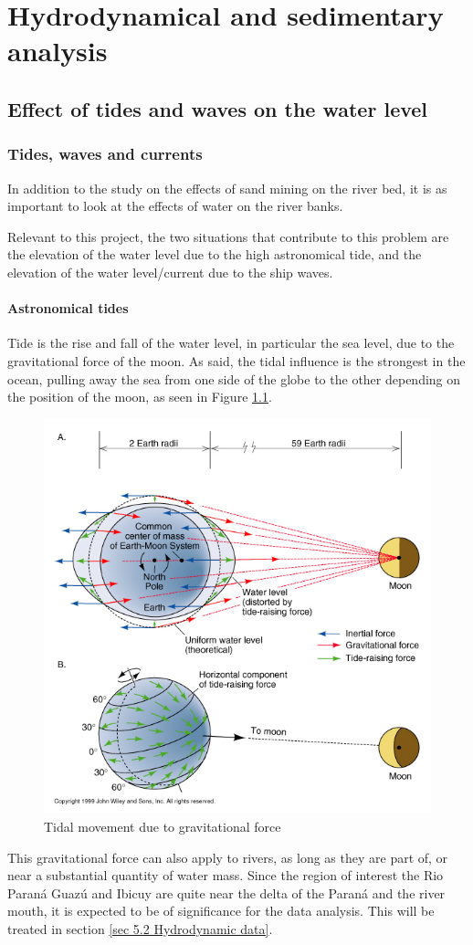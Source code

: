 \chapter{Hydrodynamical and sedimentary analysis}
\label{chap:hydroanalysis}
\section{Effect of tides and waves on the water level}

\subsection{Tides, waves and currents}
In addition to the study on the effects of sand mining on the river bed, it is as important to look at the effects of water on the river banks.

Relevant to this project, the two situations that contribute to this problem are the elevation of the water level due to the high astronomical tide, and the elevation of the water level/current due to the ship waves.

\subsubsection{Astronomical tides}

Tide is the rise and fall of the water level, in particular the sea level, due to the gravitational force of the moon\autocite{usdepartmentofcommerceTidesCurrents}. As said, the tidal influence is the strongest in the ocean, pulling away the sea from one side of the globe to the other depending on the position of the moon, as seen in Figure \ref{fig:Tidal movement due to gravitational force}.
\begin{figure}[H]
    \centering
    \includegraphics[width=0.5\linewidth]{figures/ch2/astronomical.jpg}
    \caption{Tidal movement due to gravitational force}
    \label{fig:Tidal movement due to gravitational force}
\end{figure}
This gravitational force can also apply to rivers, as long as they are part of, or near a substantial quantity of water mass. Since the region of interest the  Rio Paraná Guazú and Ibicuy are quite near the delta of the Paraná and the river mouth, it is expected to be of significance for the data analysis. This will be treated in section \ref{sec 5.2 Hydrodynamic data}.

